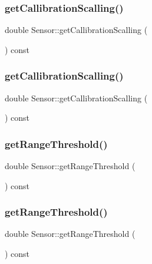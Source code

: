 \subsubsection{\texorpdfstring{get\+Callibration\+Scalling()}{getCallibrationScalling()}\hspace{0.1cm}{\footnotesize\ttfamily [1/2]}}
{\footnotesize\ttfamily double Sensor\+::get\+Callibration\+Scalling (\begin{DoxyParamCaption}{ }\end{DoxyParamCaption}) const}

\mbox{\label{class_sensor_aa3ed2c53fe69cdf256574edc0ccacdcf}} 
\subsubsection{\texorpdfstring{get\+Callibration\+Scalling()}{getCallibrationScalling()}\hspace{0.1cm}{\footnotesize\ttfamily [2/2]}}
{\footnotesize\ttfamily double Sensor\+::get\+Callibration\+Scalling (\begin{DoxyParamCaption}{ }\end{DoxyParamCaption}) const}

\mbox{\label{class_sensor_a5c0b861048790221428d0af95c8bdfe4}} 
\subsubsection{\texorpdfstring{get\+Range\+Threshold()}{getRangeThreshold()}\hspace{0.1cm}{\footnotesize\ttfamily [1/2]}}
{\footnotesize\ttfamily double Sensor\+::get\+Range\+Threshold (\begin{DoxyParamCaption}{ }\end{DoxyParamCaption}) const}

\mbox{\label{class_sensor_a5c0b861048790221428d0af95c8bdfe4}} 
\subsubsection{\texorpdfstring{get\+Range\+Threshold()}{getRangeThreshold()}\hspace{0.1cm}{\footnotesize\ttfamily [2/2]}}
{\footnotesize\ttfamily double Sensor\+::get\+Range\+Threshold (\begin{DoxyParamCaption}{ }\end{DoxyParamCaption}) const}



